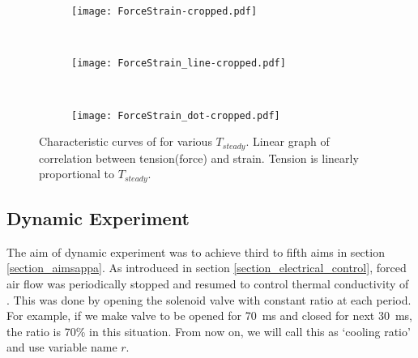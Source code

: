 \begin{figure}[t]
	\centering
	\begin{subfigure}[t]{0.32\textwidth}
		\texttt{[image: ForceStrain-cropped.pdf]}
		\caption{\label{static1_result}}
	\end{subfigure}
	~
	\begin{subfigure}[t]{0.32\textwidth}
		\texttt{[image: ForceStrain\_line-cropped.pdf]}
		\caption{\label{static1_line}}
	\end{subfigure}
	~
	\begin{subfigure}[t]{0.32\textwidth}
		\texttt{[image: ForceStrain\_dot-cropped.pdf]}
		\caption{\label{static1_dot}}
	\end{subfigure}
	\caption[Results of static experiment]{ Characteristic curves of \scp for various $T_{steady}$.  Linear graph of correlation between tension(force) and strain.  Tension is linearly proportional to $T_{steady}$.}
	\label{static1_results}
\end{figure}

\subsection{Dynamic Experiment}\label{section_dynamic} %
The aim of dynamic experiment was to achieve third to fifth aims in section \ref{section_aimsappa}.
As introduced in section \ref{section_electrical_control}, forced air flow was periodically stopped and resumed to control thermal conductivity of \scpnospace.
This was done by opening the solenoid valve with constant ratio at each period. For example, if we make valve to be opened for \SI{70}{\milli\second} and closed for next \SI{30}{\milli\second}, the ratio is 70\% in this situation. From now on, we will call this as `cooling ratio' and use variable name $r$.
 
%


